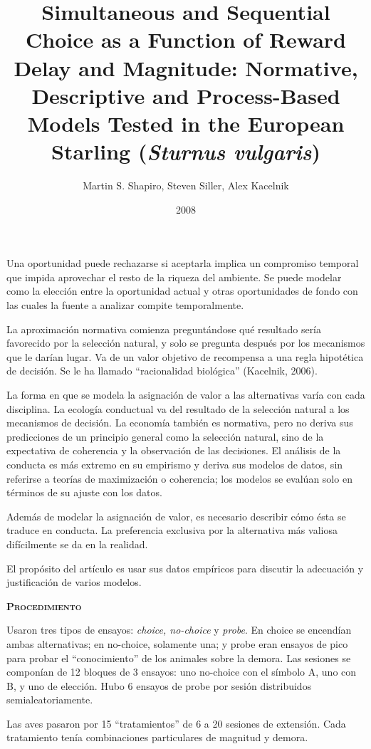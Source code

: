 \documentclass[a4paper,12pt]{article}
\title{Simultaneous and Sequential Choice as a Function of Reward Delay and Magnitude: Normative, Descriptive and Process-Based Models Tested in the European Starling ({\itshape Sturnus vulgaris})}
\author{Martin S. Shapiro, Steven Siller, Alex Kacelnik}
\date{2008}
\begin{document}
{\scshape\bfseries \maketitle}

Una oportunidad puede rechazarse si aceptarla implica un compromiso temporal que impida aprovechar el resto de la riqueza del ambiente. Se puede modelar como la elección entre la oportunidad actual y otras oportunidades de fondo con las cuales la fuente a analizar compite temporalmente.

La aproximación normativa comienza preguntándose qué resultado sería favorecido por la selección natural, y solo se pregunta después por los mecanismos que le darían lugar. Va de un valor objetivo de recompensa a una regla hipotética de decisión. Se le ha llamado ``racionalidad biológica'' (Kacelnik, 2006).

La forma en que se modela la asignación de valor a las alternativas varía con cada disciplina. La ecología conductual va del resultado de la selección natural a los mecanismos de decisión. La economía también es normativa, pero no deriva sus predicciones de un principio general como la selección natural, sino de la expectativa de coherencia y la observación de las decisiones. El análisis de la conducta es más extremo en su empirismo y deriva sus modelos de datos, sin referirse a teorías de maximización o coherencia; los modelos se evalúan solo en términos de su ajuste con los datos.

Además de modelar la asignación de valor, es necesario describir cómo ésta se traduce en conducta. La preferencia exclusiva por la alternativa más valiosa difícilmente se da en la realidad.

El propósito del artículo es usar sus datos empíricos para discutir la adecuación y justificación de varios modelos.

{\scshape\bfseries Procedimiento}

Usaron tres tipos de ensayos: {\slshape choice, no-choice} y {\slshape probe}. En choice se encendían ambas alternativas; en no-choice, solamente una; y probe eran ensayos de pico para probar el ``conocimiento'' de los animales sobre la demora. Las sesiones se componían de 12 bloques de 3 ensayos: uno no-choice con el símbolo A, uno con B, y uno de elección. Hubo 6 ensayos de probe por sesión distribuidos semialeatoriamente.

Las aves pasaron por 15 ``tratamientos'' de 6 a 20 sesiones de extensión. Cada tratamiento tenía combinaciones particulares de magnitud y demora.
\end{document}
